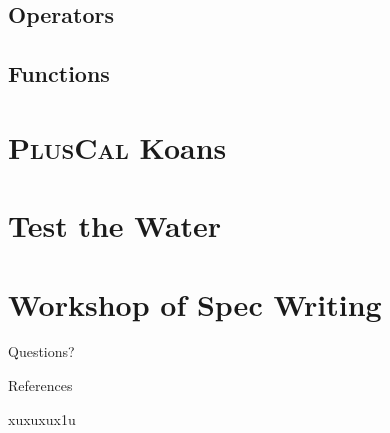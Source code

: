 \documentclass[10pt]{beamer}
\newcommand{\pluscal}{\textbf{\textsc{PlusCal}}\xspace}
\begin{document}
\subsection{Operators}

\subsection{Functions}


\section{\pluscal Koans}

\section{Test the Water}

\section{Workshop of Spec Writing}


\begin{frame}[standout]
  Questions?
\end{frame}

\appendix

\begin{frame}[allowframebreaks]{References}

  \nocite{*}
  xuxuxux1u
  

\end{frame}
\end{document}
